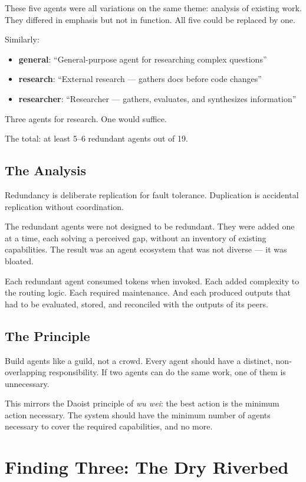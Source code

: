 \documentclass[12pt,a4paper,oneside]{book}
\begin{document}
These five agents were all variations on the same theme: analysis of existing work. They differed in emphasis but not in function. All five could be replaced by one.

Similarly:
\begin{itemize}
  \item \textbf{general}: \enquote{General-purpose agent for researching complex questions}
  \item \textbf{research}: \enquote{External research --- gathers docs before code changes}
  \item \textbf{researcher}: \enquote{Researcher --- gathers, evaluates, and synthesizes information}
\end{itemize}

Three agents for research. One would suffice.

The total: at least 5--6 redundant agents out of 19.

\section{The Analysis}

Redundancy is deliberate replication for fault tolerance. Duplication is accidental replication without coordination.

The redundant agents were not designed to be redundant. They were added one at a time, each solving a perceived gap, without an inventory of existing capabilities. The result was an agent ecosystem that was not diverse --- it was bloated.

Each redundant agent consumed tokens when invoked. Each added complexity to the routing logic. Each required maintenance. And each produced outputs that had to be evaluated, stored, and reconciled with the outputs of its peers.

\section{The Principle}

Build agents like a guild, not a crowd. Every agent should have a distinct, non-overlapping responsibility. If two agents can do the same work, one of them is unnecessary.

This mirrors the Daoist principle of \emph{wu wei}: the best action is the minimum action necessary. The system should have the minimum number of agents necessary to cover the required capabilities, and no more.

\chapter{Finding Three: The Dry Riverbed}
\end{document}
